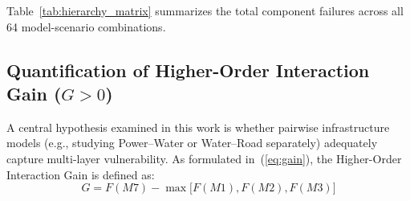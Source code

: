 \documentclass[oneside]{ieeeaccess}
\begin{document}
Table~\ref{tab:hierarchy_matrix} summarizes the total component failures across all 64 model-scenario combinations.

\begin{table}[!t]
\renewcommand{\arraystretch}{1.2}
\setlength{\tabcolsep}{2.2pt}
\caption{System-Wide Component Failures Across Coupling Hierarchy ($M0$--$M7$) and Scenarios ($S1$--$S8$)}
\label{tab:hierarchy_matrix}
\centering
{}
\end{table}

\subsection{Quantification of Higher-Order Interaction Gain ($G > 0$)}

A central hypothesis examined in this work is whether pairwise infrastructure models (e.g., studying Power--Water or Water--Road separately) adequately capture multi-layer vulnerability. As formulated in~(\ref{eq:gain}), the Higher-Order Interaction Gain is defined as:
\begin{equation}
G = F(M7) - \max\big[F(M1), F(M2), F(M3)\big]
\label{eq:gain_empirical}
\end{equation}
\end{document}
